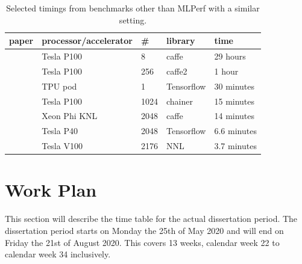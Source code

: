 \documentclass{article}
\begin{document}
\begin{table}
\begin{center}
\begin{tabu}{|l|l|l|l|l|}
\hline
paper &processor/accelerator &\# &library &time \\
\hline
\citet{he_et_al_2015} &Tesla P100 &8 &caffe &29 hours \\
\citet{goyal_et_al_2017} &Tesla P100 &256 &caffe2 &1 hour \\
\citet{smith_et_al_2017} &TPU pod &1 &Tensorflow &30 minutes \\
\citet{akiba_et_al_2017} &Tesla P100 &1024 &chainer &15 minutes \\
\citet{you2017} &Xeon Phi KNL &2048 &caffe &14 minutes \\
\citet{jia_et_al_2018} &Tesla P40 &2048 &Tensorflow &6.6 minutes \\
\citet{mikami_et_al_2018} &Tesla V100 &2176 &NNL &3.7 minutes \\
\hline
\end{tabu}
\end{center}
\caption{Selected timings from benchmarks other than MLPerf
  with a similar setting.}
\label{tab:benchmarks}
\end{table}


\section{Work Plan} %
\label{sec:work_plan}

This section will describe the time table for the actual
dissertation period.
The dissertation period starts on Monday the 25th of May
2020 and will end on Friday the 21st of August 2020.
This covers 13 weeks, calendar week 22 to calendar week 34
inclusively.
\end{document}
